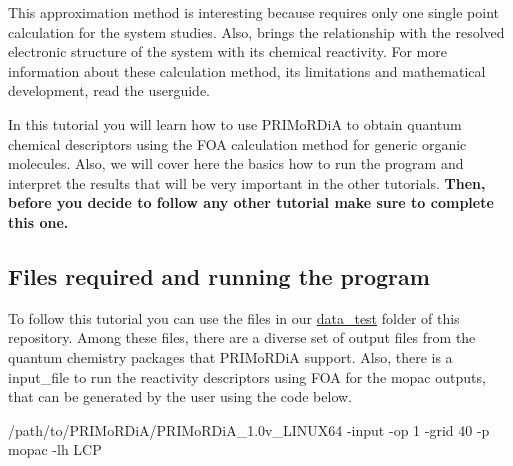 \documentclass[a4paper,11pt]{refart}
\begin{document}
This approximation method is interesting because requires only one single point calculation for the system studies. Also, brings the relationship with the resolved electronic structure of the system with its chemical reactivity. For more information about these calculation method, its limitations and mathematical development, read the userguide. 

In this tutorial you will learn how to use PRIMoRDiA to obtain quantum chemical descriptors using the FOA calculation method for generic organic molecules. Also, we will cover here the basics how to run the program and interpret the results that will be very important in the other tutorials. \textbf{Then, before you decide to follow any other tutorial make sure to complete this one.}

\subsection{Files required and running the program}

To follow this tutorial you can use  the files in our \href{https://github.com/igorChem/PRIMoRDiA1.0v/tree/master/data_test/tutorials/tutorial_1}{data\_test} folder of this repository. Among these files, there are a diverse set of output files from the quantum chemistry packages that PRIMoRDiA support. Also, there is a input\_file to run the reactivity descriptors using FOA for the mopac outputs, that can be generated by the user using the code below.

\hspace*{-\leftmarginwidth}
\begin{minipage}{\fullwidth}
	\begin{commandshell}/path/to/PRIMoRDiA/PRIMoRDiA_1.0v_LINUX64 -input -op 1 -grid 40 -p mopac -lh LCP\end{commandshell}
\end{minipage}
\end{document}
